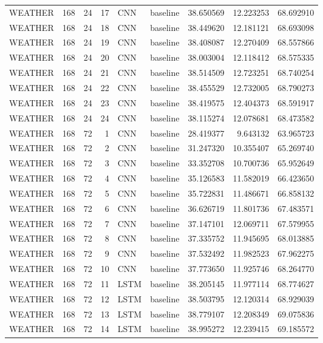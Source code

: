 \begin{table}
\begin{tabular}{lrrrllrrr}
WEATHER & 168 & 24 & 17 & CNN & baseline & 38.650569 & 12.223253 & 68.692910 \\
WEATHER & 168 & 24 & 18 & CNN & baseline & 38.449620 & 12.181121 & 68.693098 \\
WEATHER & 168 & 24 & 19 & CNN & baseline & 38.408087 & 12.270409 & 68.557866 \\
WEATHER & 168 & 24 & 20 & CNN & baseline & 38.003004 & 12.118412 & 68.575335 \\
WEATHER & 168 & 24 & 21 & CNN & baseline & 38.514509 & 12.723251 & 68.740254 \\
WEATHER & 168 & 24 & 22 & CNN & baseline & 38.455529 & 12.732005 & 68.790273 \\
WEATHER & 168 & 24 & 23 & CNN & baseline & 38.419575 & 12.404373 & 68.591917 \\
WEATHER & 168 & 24 & 24 & CNN & baseline & 38.115274 & 12.078681 & 68.473582 \\
WEATHER & 168 & 72 & 1 & CNN & baseline & 28.419377 & 9.643132 & 63.965723 \\
WEATHER & 168 & 72 & 2 & CNN & baseline & 31.247320 & 10.355407 & 65.269740 \\
WEATHER & 168 & 72 & 3 & CNN & baseline & 33.352708 & 10.700736 & 65.952649 \\
WEATHER & 168 & 72 & 4 & CNN & baseline & 35.126583 & 11.582019 & 66.423650 \\
WEATHER & 168 & 72 & 5 & CNN & baseline & 35.722831 & 11.486671 & 66.858132 \\
WEATHER & 168 & 72 & 6 & CNN & baseline & 36.626719 & 11.801736 & 67.483571 \\
WEATHER & 168 & 72 & 7 & CNN & baseline & 37.147101 & 12.069711 & 67.579955 \\
WEATHER & 168 & 72 & 8 & CNN & baseline & 37.335752 & 11.945695 & 68.013885 \\
WEATHER & 168 & 72 & 9 & CNN & baseline & 37.532492 & 11.982523 & 67.962275 \\
WEATHER & 168 & 72 & 10 & CNN & baseline & 37.773650 & 11.925746 & 68.264770 \\
WEATHER & 168 & 72 & 11 & LSTM & baseline & 38.205145 & 11.977114 & 68.774627 \\
WEATHER & 168 & 72 & 12 & LSTM & baseline & 38.503795 & 12.120314 & 68.929039 \\
WEATHER & 168 & 72 & 13 & LSTM & baseline & 38.779107 & 12.208349 & 69.075836 \\
WEATHER & 168 & 72 & 14 & LSTM & baseline & 38.995272 & 12.239415 & 69.185572 \\

\end{tabular}
\end{table}
